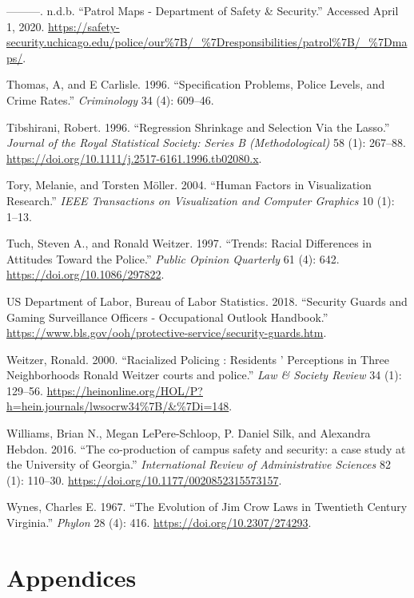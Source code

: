 \documentclass{ucetd}
\begin{document}
\leavevmode\hypertarget{ref-TheUniversityofChicago}{}%
---------. n.d.b. ``Patrol Maps - Department of Safety \& Security.''
Accessed April 1, 2020.
\url{https://safety-security.uchicago.edu/police/our\%7B/_\%7Dresponsibilities/patrol\%7B/_\%7Dmaps/}.

\leavevmode\hypertarget{ref-Thomas1996}{}%
Thomas, A, and E Carlisle. 1996. ``Specification Problems, Police
Levels, and Crime Rates.'' \emph{Criminology} 34 (4): 609--46.

\leavevmode\hypertarget{ref-Tibshirani1996}{}%
Tibshirani, Robert. 1996. ``Regression Shrinkage and Selection Via the
Lasso.'' \emph{Journal of the Royal Statistical Society: Series B
(Methodological)} 58 (1): 267--88.
\url{https://doi.org/10.1111/j.2517-6161.1996.tb02080.x}.

\leavevmode\hypertarget{ref-Tory2004}{}%
Tory, Melanie, and Torsten Möller. 2004. ``Human Factors in
Visualization Research.'' \emph{IEEE Transactions on Visualization and
Computer Graphics} 10 (1): 1--13.

\leavevmode\hypertarget{ref-Tuch1997}{}%
Tuch, Steven A., and Ronald Weitzer. 1997. ``Trends: Racial Differences
in Attitudes Toward the Police.'' \emph{Public Opinion Quarterly} 61
(4): 642. \url{https://doi.org/10.1086/297822}.

\leavevmode\hypertarget{ref-USDepartmentofLabor2018}{}%
US Department of Labor, Bureau of Labor Statistics. 2018. ``Security
Guards and Gaming Surveillance Officers - Occupational Outlook
Handbook.''
\url{https://www.bls.gov/ooh/protective-service/security-guards.htm}.

\leavevmode\hypertarget{ref-Weitzer2000}{}%
Weitzer, Ronald. 2000. ``Racialized Policing : Residents ' Perceptions
in Three Neighborhoods Ronald Weitzer courts and police.'' \emph{Law \&
Society Review} 34 (1): 129--56.
\url{https://heinonline.org/HOL/P?h=hein.journals/lwsocrw34\%7B/\&\%7Di=148}.

\leavevmode\hypertarget{ref-Williams2016}{}%
Williams, Brian N., Megan LePere-Schloop, P. Daniel Silk, and Alexandra
Hebdon. 2016. ``The co-production of campus safety and security: a case
study at the University of Georgia.'' \emph{International Review of
Administrative Sciences} 82 (1): 110--30.
\url{https://doi.org/10.1177/0020852315573157}.

\leavevmode\hypertarget{ref-Wynes1967}{}%
Wynes, Charles E. 1967. ``The Evolution of Jim Crow Laws in Twentieth
Century Virginia.'' \emph{Phylon} 28 (4): 416.
\url{https://doi.org/10.2307/274293}.


\chapter{Appendices}
\end{document}
